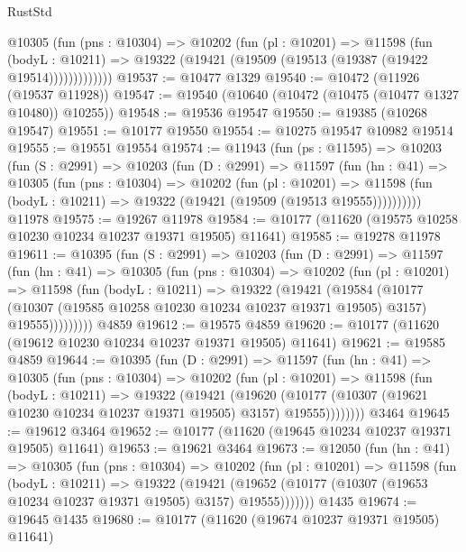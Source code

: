 \begin{lexlean}{RustStd}
\begin{coremodule}
            @10305
              (fun (pns : @10304) =>
              @10202
                (fun (pl : @10201) =>
                @11598
                  (fun (bodyL : @10211) =>
                  @19322 (@19421 (@19509 (@19513 (@19387 (@19422 @19514)))))))))))))
@19537 := @10477 @1329
@19540 := @10472 (@11926 (@19537 @11928))
@19547 := @19540 (@10640 (@10472 (@10475 (@10477 @1327 @10480)) @10255))
@19548 := @19536 @19547
@19550 := @19385 (@10268 @19547)
@19551 := @10177 @19550
@19554 := @10275 @19547 @10982 @19514
@19555 := @19551 @19554
@19574 := @11943
    (fun (ps : @11595) =>
    @10203
      (fun (S : @2991) =>
      @10203
        (fun (D : @2991) =>
        @11597
          (fun (hn : @41) =>
          @10305
            (fun (pns : @10304) =>
            @10202
              (fun (pl : @10201) =>
              @11598 (fun (bodyL : @10211) => @19322 (@19421 (@19509 (@19513 @19555))))))))))
    @11978
@19575 := @19267 @11978
@19584 := @10177 (@11620 (@19575 @10258 @10230 @10234 @10237 @19371 @19505) @11641)
@19585 := @19278 @11978
@19611 := @10395
    (fun (S : @2991) =>
    @10203
      (fun (D : @2991) =>
      @11597
        (fun (hn : @41) =>
        @10305
          (fun (pns : @10304) =>
          @10202
            (fun (pl : @10201) =>
            @11598
              (fun (bodyL : @10211) =>
              @19322
                (@19421
                  (@19584
                    (@10177
                      (@10307 (@19585 @10258 @10230 @10234 @10237 @19371 @19505) @3157)
                      @19555)))))))))
    @4859
@19612 := @19575 @4859
@19620 := @10177 (@11620 (@19612 @10230 @10234 @10237 @19371 @19505) @11641)
@19621 := @19585 @4859
@19644 := @10395
    (fun (D : @2991) =>
    @11597
      (fun (hn : @41) =>
      @10305
        (fun (pns : @10304) =>
        @10202
          (fun (pl : @10201) =>
          @11598
            (fun (bodyL : @10211) =>
            @19322
              (@19421
                (@19620
                  (@10177 (@10307 (@19621 @10230 @10234 @10237 @19371 @19505) @3157) @19555))))))))
    @3464
@19645 := @19612 @3464
@19652 := @10177 (@11620 (@19645 @10234 @10237 @19371 @19505) @11641)
@19653 := @19621 @3464
@19673 := @12050
    (fun (hn : @41) =>
    @10305
      (fun (pns : @10304) =>
      @10202
        (fun (pl : @10201) =>
        @11598
          (fun (bodyL : @10211) =>
          @19322
            (@19421
              (@19652 (@10177 (@10307 (@19653 @10234 @10237 @19371 @19505) @3157) @19555)))))))
    @1435
@19674 := @19645 @1435
@19680 := @10177 (@11620 (@19674 @10237 @19371 @19505) @11641)

\end{coremodule}
\end{lexlean}
